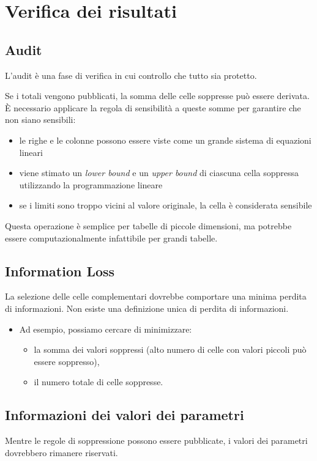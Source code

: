 \documentclass{report}
\begin{document}
\newpage
\section{Verifica dei risultati}
\subsection{Audit}
L'audit è una fase di verifica in cui controllo che tutto sia protetto.

\noindent Se i totali vengono pubblicati, la somma delle celle soppresse può essere 
derivata. È necessario applicare la regola di sensibilità a queste somme per garantire
che non siano sensibili:
\begin{itemize}
    \item le righe e le colonne possono essere viste come un grande sistema di equazioni lineari 
    \item viene stimato un \textit{lower bound} e un \textit{upper bound} di ciascuna cella soppressa utilizzando la programmazione lineare 
    \item se i limiti sono troppo vicini al valore originale, la cella è considerata sensibile  
\end{itemize}

\noindent Questa operazione è semplice per tabelle di piccole dimensioni, ma potrebbe essere 
computazionalmente infattibile per grandi tabelle.

\subsection{Information Loss}
La selezione delle celle complementari dovrebbe comportare una minima perdita di informazioni. 
Non esiste una definizione unica di perdita di informazioni.
\begin{itemize}
    \item Ad esempio, possiamo cercare di minimizzare:
    \begin{itemize}
        \item la somma dei valori soppressi (alto numero di celle con valori piccoli può essere soppresso),
        \item il numero totale di celle soppresse.
    \end{itemize}
\end{itemize}

\subsection{Informazioni dei valori dei parametri}
Mentre le regole di soppressione possono essere pubblicate, i valori dei parametri 
dovrebbero rimanere riservati. 
\end{document}
